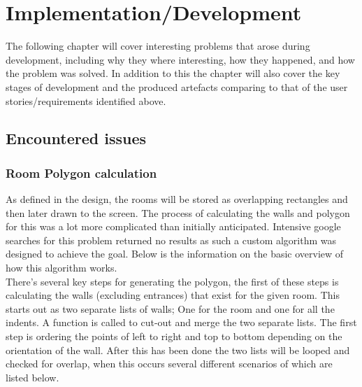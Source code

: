 \section{Implementation/Development}
The following chapter will cover interesting problems that arose during development, including why they where interesting, how they happened, and how the problem was solved. In addition to this the chapter will also cover the key stages of development and the produced artefacts comparing to that of the user stories/requirements identified above.

\subsection{Encountered issues}
\subsubsection{Room Polygon calculation}
As defined in the design, the rooms will be stored as overlapping rectangles and then later drawn to the screen. The process of calculating the walls and polygon for this was a lot more complicated than initially anticipated. Intensive google searches for this problem returned no results as such a custom algorithm was designed to achieve the goal. Below is the information on the basic overview of how this algorithm works.\\

There's several key steps for generating the polygon, the first of these steps is calculating the walls (excluding entrances) that exist for the given room. This starts out as two separate lists of walls; One for the room and one for all the indents. A function is called to cut-out and merge the two separate lists. The first step is ordering the points of left to right and top to bottom depending on the orientation of the wall. After this has been done the two lists will be looped and checked for overlap, when this occurs several different scenarios of which are listed below.

